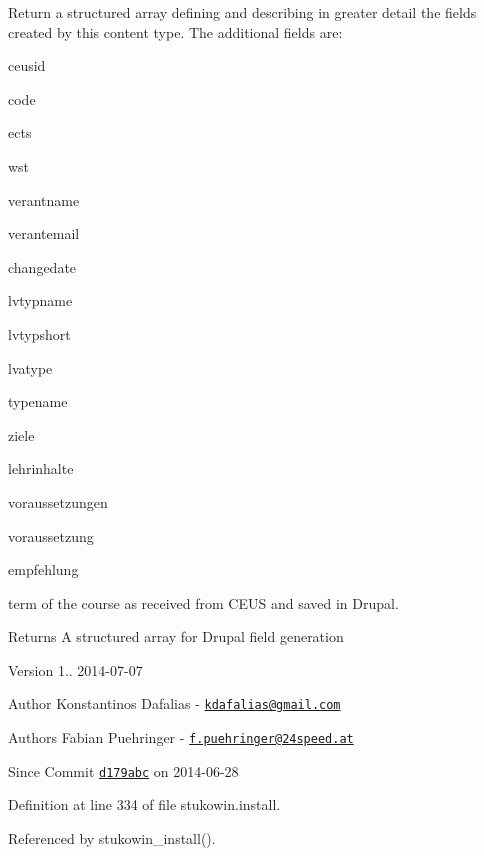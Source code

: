 Return a structured array defining and describing in greater detail the fields created by this content type. The additional fields are\+:
\begin{DoxyItemize}
\item ceusid
\item code
\item ects
\item wst
\item verantname
\item verantemail
\item changedate
\item lvtypname
\item lvtypshort
\item lvatype
\item typename
\item ziele
\item lehrinhalte
\item voraussetzungen
\item voraussetzung
\item empfehlung
\item term of the course as received from C\+E\+U\+S and saved in Drupal. \begin{DoxyReturn}{Returns}
A structured array for Drupal field generation
\end{DoxyReturn}
\begin{DoxyVersion}{Version}
1.. 2014-\/07-\/07 
\end{DoxyVersion}
\begin{DoxyAuthor}{Author}
Konstantinos Dafalias -\/ \href{mailto:kdafalias@gmail.com}{\tt kdafalias@gmail.\+com} 
\end{DoxyAuthor}
\begin{DoxyAuthor}{Authors}
Fabian Puehringer -\/ \href{mailto:f.puehringer@24speed.at}{\tt f.\+puehringer@24speed.\+at} 
\end{DoxyAuthor}
\begin{DoxySince}{Since}
Commit \href{http://github.com/TheJake123/DrupalModul/commit/d179abcc5e05743086cd67cf1ce30b08923a7183}{\tt d179abc} on 2014-\/06-\/28 
\end{DoxySince}

\end{DoxyItemize}

Definition at line 334 of file stukowin.\+install.



Referenced by stukowin\+\_\+install().



